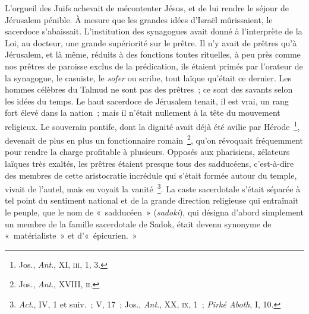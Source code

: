 \documentclass[french,twoside]{book} %
\begin{document}
L’orgueil des Juifs achevait de mécontenter Jésus, et de lui rendre le séjour de Jérusalem pénible. À mesure que les grandes idées d’Israël mûrissaient, le sacerdoce s’abaissait. L’institution des synagogues avait donné à l’interprète de la Loi, au docteur, une grande supériorité sur le prêtre. Il n’y avait de prêtres qu’à Jérusalem, et là même, réduits à des fonctions toutes rituelles, à peu près comme nos prêtres de paroisse exclus de la prédication, ils étaient primés par l’orateur de la synagogue, le casuiste, le {\itshape sofer} ou scribe, tout laïque qu’était ce dernier. Les hommes célèbres du Talmud ne sont pas des prêtres ; ce sont des savants selon les idées du temps. Le haut sacerdoce de Jérusalem tenait, il est vrai, un rang fort élevé dans la nation ; mais il n’était nullement à la tête du mouvement religieux. Le souverain pontife, dont la dignité avait déjà été avilie par Hérode \footnote{ Jos., {\itshape Ant}., XI, \textsc{iii}, 1, 3.}, devenait de plus en plus un fonctionnaire romain \footnote{ Jos., {\itshape Ant}., XVIII, \textsc{ii}.}, qu’on révoquait fréquemment pour rendre la charge profitable à plusieurs. Opposés aux pharisiens, zélateurs laïques très exaltés, les prêtres étaient presque tous des sadducéens, c’est-à-dire des membres de cette aristocratie incrédule qui s’était formée autour du temple, vivait de l’autel, mais en voyait la vanité \footnote{{\itshape Act}., IV, 1 et suiv. ; V, 17 ; Jos., {\itshape Ant}., XX, \textsc{ix}, 1 ; {\itshape Pirké Aboth}, I, 10.}. La caste sacerdotale s’était séparée à tel point du sentiment national et de la grande direction religieuse qui entraînait le peuple, que le nom de « sadducéen » ({\itshape sadoki}), qui désigna d’abord simplement un membre de la famille sacerdotale de Sadok, était devenu synonyme de « matérialiste » et d’« épicurien. »\par
\end{document}
